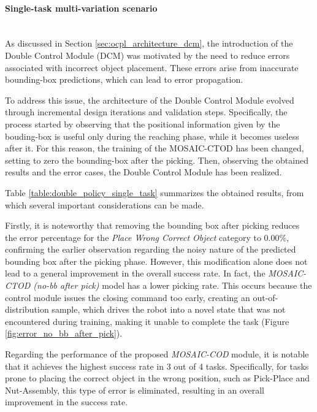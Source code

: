 \paragraph*{Single-task multi-variation scenario}\mbox{}\\
As discussed in Section \ref{sec:ocpl_architecture_dcm}, the introduction of the Double Control Module (DCM) was motivated by the need to reduce errors associated with incorrect object placement. These errors arise from inaccurate bounding-box predictions, which can lead to error propagation. 

To address this issue, the architecture of the Double Control Module evolved through incremental design iterations and validation steps.
Specifically, the process started by observing that the positional information given by the bouding-box is useful only during the reaching phase, while it becomes useless after it. For this reason, the training of the MOSAIC-CTOD has been changed, setting to zero the bounding-box after the picking. Then, observing the obtained results and the error cases, the Double Control Module has been realized.


Table \ref{table:double_policy_single_task} summarizes the obtained results, from which several important considerations can be made.

Firstly, it is noteworthy that removing the bounding box after picking reduces the error percentage for the \textit{Place Wrong Correct Object} category to 0.00\%, confirming the earlier observation regarding the noisy nature of the predicted bounding box after the picking phase. However, this modification alone does not lead to a general improvement in the overall success rate. In fact, the \textit{MOSAIC-CTOD (no-bb after pick)} model has a lower picking rate. This occurs because the control module issues the closing command too early, creating an out-of-distribution sample, which drives the robot into a novel state that was not encountered during training, making it unable to complete the task (Figure \ref{fig:error_no_bb_after_pick}).



Regarding the performance of the proposed \textit{MOSAIC-COD} module, it is notable that it achieves the highest success rate in 3 out of 4 tasks. Specifically, for tasks prone to placing the correct object in the wrong position, such as Pick-Place and Nut-Assembly, this type of error is eliminated, resulting in an overall improvement in the success rate.

